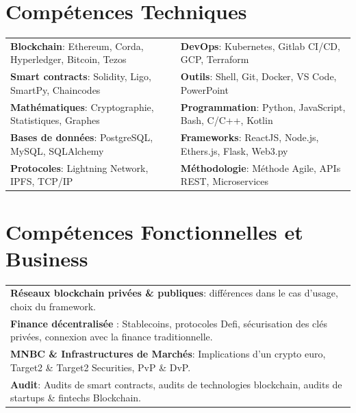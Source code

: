 \documentclass[10pt]{article}
\begin{document}
\vspace{2ex}

\section*{Compétences Techniques}

\vspace{2ex}

\begin{tabular}{ l l }
\textbf{Blockchain}: Ethereum, Corda, Hyperledger, Bitcoin, Tezos & \textbf{DevOps}: Kubernetes, Gitlab CI/CD, GCP, Terraform \\[0.1cm]
\textbf{Smart contracts}: Solidity, Ligo, SmartPy, Chaincodes & \textbf{Outils}: Shell, Git, Docker, VS Code, PowerPoint \\[0.1cm]
\textbf{Mathématiques}: Cryptographie, Statistiques, Graphes & \textbf{Programmation}: Python, JavaScript, Bash, C/C++, Kotlin \\[0.1cm]
\textbf{Bases de données}: PostgreSQL, MySQL, SQLAlchemy & \textbf{Frameworks}: ReactJS, Node.js, Ethers.js, Flask, Web3.py \\[0.1cm]
\textbf{Protocoles}: Lightning Network, IPFS, TCP/IP & \textbf{Méthodologie}: Méthode Agile, APIs REST, Microservices \\[0.1cm]
\end{tabular}

\vspace{2ex}

\section*{Compétences Fonctionnelles et Business}

\vspace{2ex}

\begin{tabular}{ l }
\textbf{Réseaux blockchain privées \& publiques}: différences dans le cas d'usage, choix du framework.\\[0.1cm]
\textbf{Finance décentralisée} : Stablecoins, protocoles Defi, sécurisation des clés privées, connexion avec la finance traditionnelle.\\[0.1cm]
\textbf{MNBC \& Infrastructures de Marchés}: Implications d'un crypto euro, Target2 \& Target2 Securities, PvP \& DvP.\\[0.1cm]
\textbf{Audit}: Audits de smart contracts, audits de technologies blockchain, audits de startups \& fintechs Blockchain.\\[0.1cm]
\end{tabular}
\end{document}
